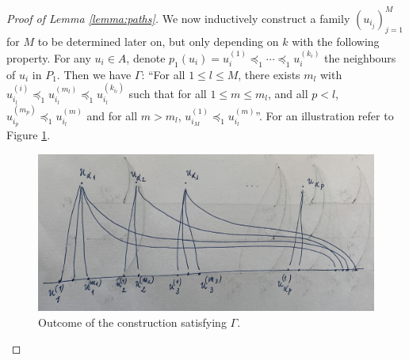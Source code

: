 \documentclass[12pt]{article}
\theoremstyle{definition}
\begin{document}
\begin{proof}[Proof of Lemma \ref{lemma:paths}]
        We now inductively construct 
        a family $\left(u_{i_{j}}\right)_{j=1}^{M}$ 
        for $M$ to be determined later on,
        but only depending on $k$ with
        the following property.
        For any $u_{i} \in A$,
        denote $p_1\left(u_{i}\right) = 
        u_{i}^{\left(1\right)} \preceq_1 \cdots
        \preceq_1 u_{i}^{\left(k_{i}\right)}$
        the neighbours of $u_{i}$ in $P_1$.
        Then we have $\Gamma$:
        ``For all $1 \leq l \leq M$,
        there exists $m_{l}$ with
        $u_{i_{l}}^{\left(i\right)} \preceq_1 
        u_{i_{l}}^{\left(m_{l}\right)} \preceq_1
        u_{i_{l}}^{\left(k_{i_{l}}\right)}$ 
        such that for all $1 \leq m \leq m_{l}$,
        and all $p < l$,
        $u_{i_{p}}^{\left(m_{p}\right)}
        \preceq_1 u_{i_{l}}^{\left(m\right)}$ 
        and for all $m > m_{l}$, 
        $u_{i_{M}}^{\left(1\right)}
        \preceq_1 u_{i_{l}}^{\left(m\right)}$''.
        For an illustration refer to Figure \ref{fig:nest}.
        \begin{figure}[ht]
            \centering
            \includegraphics[width=0.75\linewidth]{figures/nest.jpg}
            \caption{Outcome of the construction satisfying $\Gamma$.}
            \label{fig:nest}
        \end{figure}


\end{proof}
\end{document}
